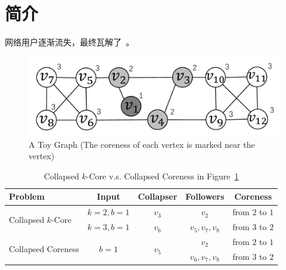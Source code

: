\section{简介}

网络用户逐渐流失，最终瓦解了~\cite{friendster,DBLP:conf/cosn/GarciaMS13}。

\begin{figure}
    \centering
    \includegraphics[width=0.7\linewidth]{figures/toy-example}
    \caption{A Toy Graph (The coreness of each vertex is marked near the vertex)}%
    \label{fig:example}
\end{figure}

\begin{table}[t]
    \centering%
    \caption{Collapsed $k$-Core v.s. Collapsed Coreness in Figure~\ref{fig:example}}
    \label{tab:example}
    \begin{tabular}{|l|c|c|c|c|}
        \hline
        \bf{Problem}                    & \bf{Input}             & \bf{Collapser}         & \bf{Followers}      & \bf{Coreness}   \\
        \hline
        \hline
        \multirow{2}{*}{Collapsed $k$-Core} & $k=2,b=1$              & $v_3$                  & $v_2$               & from $2$ to $1$ \\

        \cline{2-5}                         & $k=3,b=1$              & $v_6$                  & $v_{5},v_{7},v_{8}$ & from $3$ to $2$ \\
        \hline
        \multirow{2}{*}{Collapsed Coreness} & \multirow{2}{*}{$b=1$} & \multirow{2}{*}{$v_5$} & $v_2$ & from $2$ to $1$ \\
        \cline{4-5}                         &                        &                        & $v_6,v_7,v_8$       & from $3$ to $2$ \\

        \hline
    \end{tabular}
\end{table}
